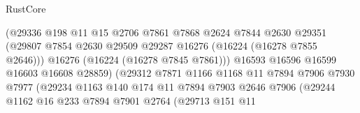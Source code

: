 \begin{lexlean}{RustCore}
\begin{coremodule}
                                        (@29336
                                          @198
                                          @11
                                          @15
                                          @2706
                                          @7861
                                          @7868
                                          @2624
                                          @7844
                                          @2630
                                          @29351
                                          (@29807
                                            @7854
                                            @2630
                                            @29509
                                            @29287
                                            @16276
                                            (@16224 (@16278 @7855 @2646)))
                                          @16276
                                          (@16224 (@16278 @7845 @7861)))
                                        @16593
                                        @16596
                                        @16599
                                        @16603
                                        @16608
                                        @28859)
                                      (@29312
                                        @7871
                                        @1166
                                        @1168
                                        @11
                                        @7894
                                        @7906
                                        @7930
                                        @7977
                                        (@29234
                                          @1163
                                          @140
                                          @174
                                          @11
                                          @7894
                                          @7903
                                          @2646
                                          @7906
                                          (@29244
                                            @1162
                                            @16
                                            @233
                                            @7894
                                            @7901
                                            @2764
                                            (@29713
                                              @151
                                              @11

\end{coremodule}
\end{lexlean}
